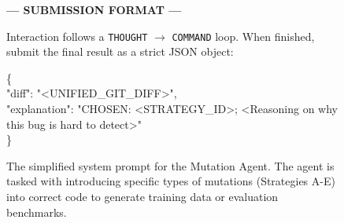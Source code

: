 \documentclass[11pt]{article}
\begin{document}
\begin{figure}[t!]
\begin{tcolorbox}
    \begin{center}
        \color{gray!50!black}\textbf{--- SUBMISSION FORMAT ---}
    \end{center}
    \vspace{5pt}

    Interaction follows a \texttt{THOUGHT} $\to$ \texttt{COMMAND} loop. 
    When finished, submit the final result as a strict JSON object:

    \{ \\
    \quad "diff": "<UNIFIED\_GIT\_DIFF>", \\
    \quad "explanation": "CHOSEN: <STRATEGY\_ID>; <Reasoning on why this bug is hard to detect>" \\
    \}

    \end{tcolorbox}
    \caption{The simplified system prompt for the Mutation Agent. The agent is tasked with introducing specific types of mutations (Strategies A-E) into correct code to generate training data or evaluation benchmarks.}
    \label{fig:injector_prompt}
\end{figure}
\end{document}
